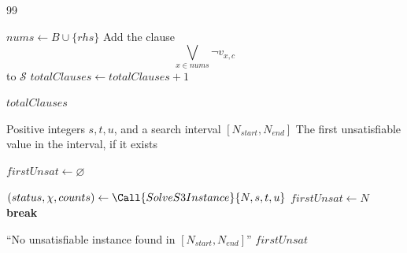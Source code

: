 \documentclass[twoside, 12pt]{article}
\begin{document}
\begin{thebibliography}{99}
\begin{algorithm}[htbp]
\begin{algorithmic}[1]
            \State $nums \gets B \cup \{rhs\}$
            \State Add the clause
            \[
            \bigvee_{x\in nums}\neg v_{x,c}
            \]
            to $\mathcal{S}$
            \State $totalClauses \gets totalClauses + 1$
        \EndIf
    \EndFor
\EndFor

\State \Return $totalClauses$
\end{algorithmic}
\end{algorithm}


\begin{algorithm}[htbp]\scriptsize
\caption{Range search for $S(3;s,t,u)$}
\label{alg:search_range}
\begin{algorithmic}[1]
\Require Positive integers $s,t,u$, and a search interval $[N_{start},N_{end}]$
\Ensure The first unsatisfiable value in the interval, if it exists

\State $firstUnsat \gets \varnothing$

    \State $(status,\chi,counts) \gets \Call{SolveS3Instance}{N,s,t,u}$
        \State $firstUnsat \gets N$
        \State \textbf{break}
    \EndIf
\EndFor

    \State \Return ``No unsatisfiable instance found in $[N_{start},N_{end}]$''
\Else
    \State \Return $firstUnsat$
\EndIf
\end{algorithmic}
\end{algorithm}
























\end{thebibliography}
\end{document}
